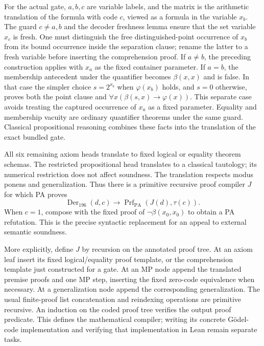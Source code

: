 For the actual gate, $a,b,c$ are variable labels, and the matrix is the
arithmetic translation of the formula with code $c$, viewed as a formula
in the variable $x_b$. The guard $c\ne a,b$ and the decoder freshness
lemma ensure that the set variable $x_c$ is fresh. One must distinguish
the free distinguished-point occurrence of $x_b$ from its bound occurrence
inside the separation clause; rename the latter to a fresh variable before
inserting the comprehension proof. If $a\ne b$, the preceding construction
applies with $x_a$ as the fixed container parameter. If $a=b$, the membership
antecedent under the quantifier becomes $\beta(x,x)$ and is false. In that
case the simpler choice $s=2^{x_b}$ when $\varphi(x_b)$ holds, and
$s=0$ otherwise, proves both the point clause and
$\forall x(\beta(s,x)\to\varphi(x))$. This separate case avoids treating
the captured occurrence of $x_a$ as a fixed parameter. Equality
and membership vacuity are ordinary quantifier theorems under the same
guard. Classical propositional reasoning combines these facts into the
translation of the exact bundled gate.

All six remaining axiom heads translate to fixed logical or equality
theorem schemas. The restricted propositional head translates to a
classical tautology; its numerical restriction does not affect soundness.
The translation respects modus ponens and generalization. Thus there is a
primitive recursive proof compiler $J$ for which PA proves
\begin{equation}\label{eq:compiler-sound-audit}
 \operatorname{Der}_{196}(d,c)\longrightarrow
 \operatorname{Prf}_{\mathrm{PA}}(J(d),\tau(c)).
\end{equation}
When $c=1$, compose with the fixed proof of
$\neg\beta(x_0,x_0)$ to obtain a PA refutation. This is the precise
syntactic replacement for an appeal to external semantic soundness.

More explicitly, define $J$ by recursion on the annotated proof tree.
At an axiom leaf insert its fixed logical/equality proof template, or
the comprehension template just constructed for a gate. At an MP node
append the translated premise proofs and one MP step, inserting the
fixed zero-code equivalence when necessary. At a generalization node
append the corresponding generalization. The usual finite-proof list
concatenation and reindexing operations are primitive recursive. An
induction on the coded proof tree verifies the output proof predicate.
This defines the mathematical compiler; writing its concrete Gödel-code
implementation and verifying that implementation in Lean remain separate
tasks.

